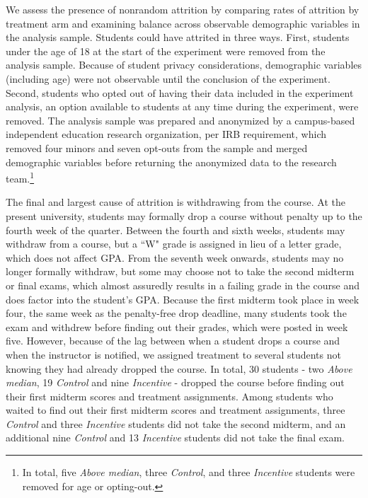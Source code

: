 \documentclass[12pt]{article}
\begin{document}
We assess the presence of nonrandom attrition by comparing rates of attrition by treatment arm and examining balance across observable demographic variables in the analysis sample. Students could have attrited in three ways. First, students under the age of 18 at the start of the experiment were removed from the analysis sample. Because of student privacy considerations, demographic variables (including age) were not observable until the conclusion of the experiment. Second, students who opted out of having their data included in the experiment analysis, an option available to students at any time during the experiment, were removed. The analysis sample was prepared and anonymized by a campus-based independent education research organization, per IRB requirement, which removed four minors and seven opt-outs from the sample and merged demographic variables before returning the anonymized data to the research team.\footnote{In total, five \textit{Above median}, three \textit{Control}, and three \textit{Incentive} students were removed for age or opting-out.}

The final and largest cause of attrition is withdrawing from the course. At the present university, students may formally drop a course without penalty up to the fourth week of the quarter. Between the fourth and sixth weeks, students may withdraw from a course, but a ``W" grade is assigned in lieu of a letter grade, which does not affect GPA. From the seventh week onwards, students may no longer formally withdraw, but some may choose not to take the second midterm or final exams, which almost assuredly results in a failing grade in the course and does factor into the student's GPA. Because the first midterm took place in week four, the same week as the penalty-free drop deadline, many students took the exam and withdrew before finding out their grades, which were posted in week five. However, because of the lag between when a student drops a course and when the instructor is notified, we assigned treatment to several students not knowing they had already dropped the course. In total, 30 students - two \textit{Above median}, 19 \textit{Control} and nine \textit{Incentive} - dropped the course before finding out their first midterm scores and treatment assignments. Among students who waited to find out their first midterm scores and treatment assignments, three \textit{Control} and three \textit{Incentive} students did not take the second midterm, and an additional nine \textit{Control} and 13 \textit{Incentive} students did not take the final exam.
\end{document}
